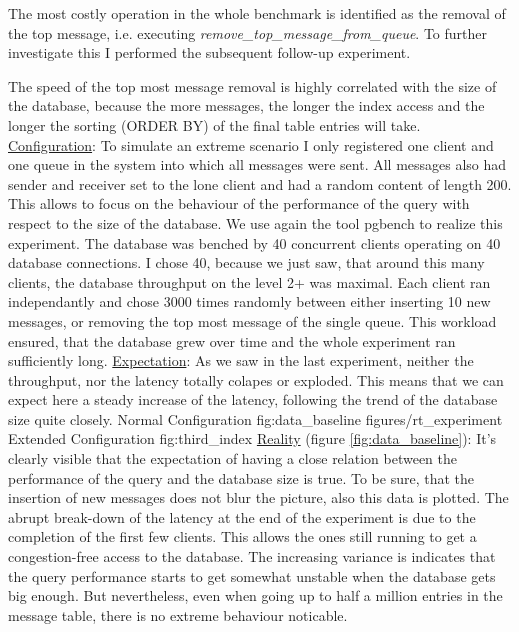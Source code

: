 \documentclass[11pt]{article}
\begin{document}
The most costly operation in the whole benchmark is identified as the removal of the top message, i.e. executing \textit{remove\_top\_message\_from\_queue}. To further investigate this I performed the subsequent follow-up experiment.

The speed of the top most message removal is highly correlated with the size of the database, because the more messages, the longer the index access and the longer the sorting (ORDER BY) of the final table entries will take.
\newline\underline{Configuration}: To simulate an extreme scenario I only registered one client and one queue in the system into which all messages were sent. All messages also had sender and receiver set to the lone client and had a random content of length 200. This allows to focus on the behaviour of the performance of the query with respect to the size of the database. We use again the tool pgbench to realize this experiment. The database was benched by 40 concurrent clients operating on 40 database connections. I chose 40, because we just saw, that around this many clients, the database throughput on the level 2+ was maximal. Each client ran independantly and chose 3000 times randomly between either inserting 10 new messages, or removing the top most message of the single queue. This workload ensured, that the database grew over time and the whole experiment ran sufficiently long.
\newline\underline{Expectation}: As we saw in the last experiment, neither the throughput, nor the latency totally colapes or exploded. This means that we can expect here a steady increase of the latency, following the trend of the database size quite closely.
 {Normal Configuration} {fig:data_baseline}
		{figures/rt_experiment} {Extended Configuration} {fig:third_index}
\newline\underline{Reality} (figure \ref{fig:data_baseline}): It's clearly visible that the expectation of having a close relation between the performance of the query and the database size is true. To be sure, that the insertion of new messages does not blur the picture, also this data is plotted. The abrupt break-down of the latency at the end of the experiment is due to the completion of the first few clients. This allows the ones still running to get a congestion-free access to the database. The increasing variance is indicates that the query performance starts to get somewhat unstable when the database gets big enough. But nevertheless, even when going up to half a million entries in the message table, there is no extreme behaviour noticable.
\end{document}

